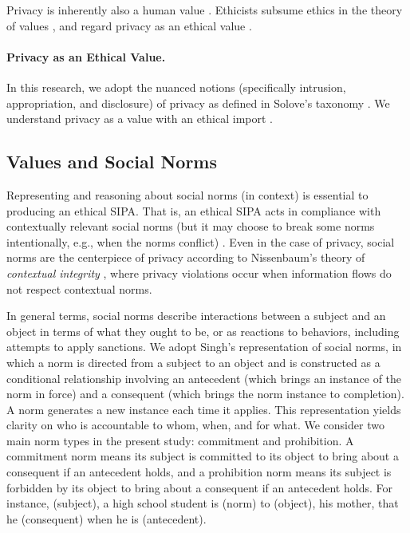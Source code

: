 Privacy is inherently also a human value \citep{spiekermann2009enggprivacy,smith2007privacy}. 
Ethicists subsume ethics in the theory of values \cite{Friedman+08:value-sensitive-design}, and regard privacy as an ethical value \citep{Langheinrich-01:privacy,Taylor-2002-PrivacyAutonomy}. 


\paragraph*{Privacy as an Ethical Value.}
In this research, we adopt the nuanced notions
(specifically intrusion, appropriation, and disclosure) of privacy as
defined in Solove's taxonomy \citep{solove-2006-taxonomy}. 
We understand privacy as a value with an ethical import \citep{Langheinrich-01:privacy,Taylor-2002-PrivacyAutonomy}.


\subsection{Values and Social Norms}
Representing and reasoning about social norms (in context) is essential to producing an ethical SIPA. 
That is, an ethical SIPA acts in compliance with contextually relevant social norms (but it may choose to break some norms intentionally, e.g., when the norms conflict) \citep{Ajmeri-AAMAS17-Arnor}. 
Even in the case of privacy, social norms are the centerpiece of privacy according to Nissenbaum's theory of \emph{contextual integrity} \citep{Nissenbaum-04:integrity,Nissenbaum-11:online}, where privacy violations occur when information flows do not respect contextual norms.

In general terms, social norms describe interactions between a subject and an object in terms of what they ought to be, or as reactions to behaviors, including attempts to apply sanctions. 
We adopt Singh's \cite{Singh-2013-Norms} representation of social norms, in which a norm is directed from a subject to an object and is constructed as a conditional relationship involving an antecedent (which brings an instance of the norm in force) and a consequent (which brings the norm instance to completion). 
A norm generates a new instance each time it applies. 
This representation yields clarity on who is accountable to whom, when, and for what. 
We consider two main norm types in the present study: commitment and prohibition. 
A commitment norm means its subject is committed to its object to bring about a consequent if an antecedent holds, and a prohibition norm means its subject is forbidden by its object to bring about a consequent if an antecedent holds. 
For instance,  (subject), a high school student is  (norm) to  (object), his mother, that he  (consequent) when he is  (antecedent).

